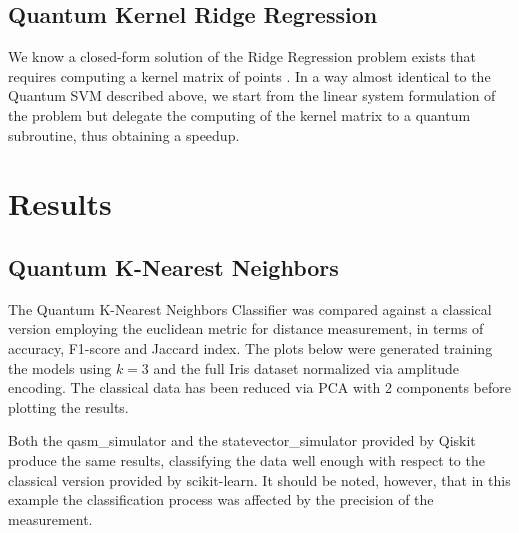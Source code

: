 \documentclass{article}
\begin{document}
\begin{multicols}{2}
\subsection{Quantum Kernel Ridge Regression}
We know a closed-form solution of the Ridge Regression problem exists that requires computing a kernel matrix of points \cite{lecture_6}. In a way almost identical to the Quantum SVM described above, we start 
from the linear system formulation of the problem but delegate the computing of the kernel matrix to a quantum subroutine, thus obtaining a speedup.
\section{Results}
\subsection{Quantum K-Nearest Neighbors}
The Quantum K-Nearest Neighbors Classifier was compared against a classical version employing the euclidean metric for distance measurement, in terms of accuracy, F1-score and Jaccard index. The plots below were generated training the models using $k = 3$ and the full Iris dataset normalized via amplitude encoding. The classical data has been reduced via PCA with 2 components before plotting the results.

Both the qasm\_simulator and the statevector\_simulator provided by Qiskit produce the same results, classifying the data well enough with respect to the classical version provided by scikit-learn. It should be noted, however, that in this example the classification process was affected by the precision of the measurement.


\end{multicols}
\end{document}
